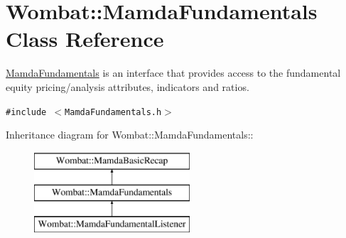 \hypertarget{classWombat_1_1MamdaFundamentals}{
\section{Wombat::Mamda\-Fundamentals Class Reference}
\label{classWombat_1_1MamdaFundamentals}
}
\hyperlink{classWombat_1_1MamdaFundamentals}{Mamda\-Fundamentals} is an interface that provides access to the fundamental equity pricing/analysis attributes, indicators and ratios.  


{\tt \#include $<$Mamda\-Fundamentals.h$>$}

Inheritance diagram for Wombat::Mamda\-Fundamentals::\begin{figure}[H]
\begin{center}
\leavevmode
\includegraphics[height=3cm]{classWombat_1_1MamdaFundamentals}
\end{center}
\end{figure}
